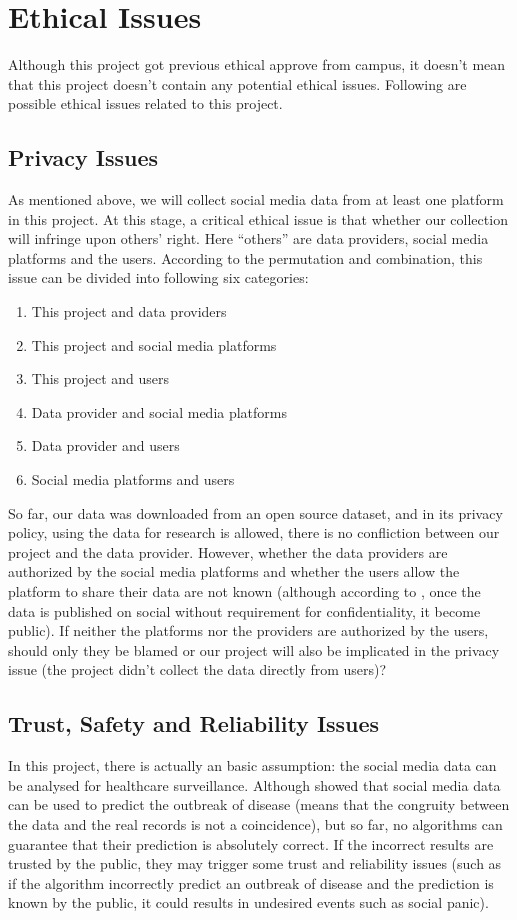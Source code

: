 \section{Ethical Issues}
Although this project got previous ethical approve from campus, it doesn't mean that this project doesn't contain any potential ethical issues. Following are possible ethical issues related to this project.
\subsection{Privacy Issues}
\label{privacy}
As mentioned above, we will collect social media data from at least one platform in this project. At this stage, a critical ethical issue is that whether our collection will infringe upon others' right. Here ``others'' are data providers, social media platforms and the users. According to the permutation and combination, this issue can be divided into following six categories:
\begin{enumerate}
    \item This project and data providers
    \item This project and social media platforms
    \item This project and users
    \item Data provider and social media platforms
    \item Data provider and users
    \item Social media platforms and users
\end{enumerate}
So far, our data was downloaded from an open source dataset, and in its privacy policy, using the data for research is allowed, there is no confliction between our project and the data provider. However, whether the data providers are authorized by the social media platforms and whether the users allow the platform to share their data are not known (although according to \cite{burkell2014facebook}, once the data is published on social without requirement for confidentiality, it become public). If neither the platforms nor the providers are authorized by the users, should only they be blamed or our project will also be implicated in the privacy issue (the project didn't collect the data directly from users)?
\subsection{Trust, Safety and Reliability Issues}
In this project, there is actually an basic assumption: the social media data can be analysed for healthcare surveillance. Although \cite{andreu2015big,denecke2009valuable,lamb2013separating} showed that social media data can be used to predict the outbreak of disease (means that the congruity between the data and the real records is not a coincidence), but so far, no algorithms can guarantee that their prediction is absolutely correct. If the incorrect results are trusted by the public, they may trigger some trust and reliability issues (such as if the algorithm incorrectly predict an outbreak of disease and the prediction is known by the public, it could results in undesired events such as social panic).
